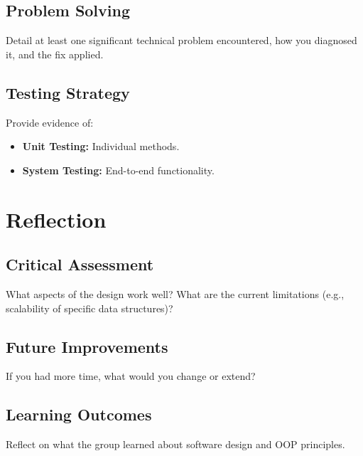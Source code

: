 \documentclass[11pt,a4paper]{article}
\begin{document}
\subsection{Problem Solving}
Detail at least one significant technical problem encountered, how you diagnosed it, and the fix applied.

\subsection{Testing Strategy}
Provide evidence of:
\begin{itemize}
    \item \textbf{Unit Testing:} Individual methods.
    \item \textbf{System Testing:} End-to-end functionality.
\end{itemize}

\section{Reflection}
\label{sec:reflection}

\subsection{Critical Assessment}
What aspects of the design work well? What are the current limitations (e.g., scalability of specific data structures)?

\subsection{Future Improvements}
If you had more time, what would you change or extend?

\subsection{Learning Outcomes}
Reflect on what the group learned about software design and OOP principles.
\end{document}
